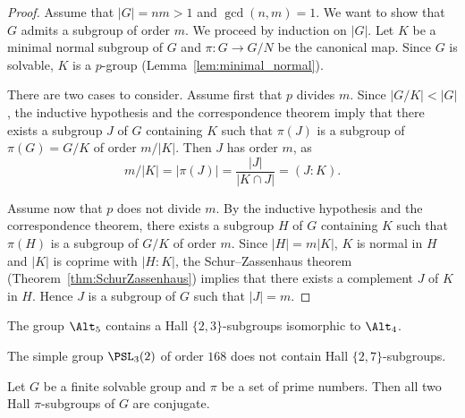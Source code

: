 \begin{proof}
	Assume that $|G|=nm>1$ and $\gcd(n,m)=1$. We want to show that $G$ admits a
	subgroup of order $m$. We proceed by induction on $|G|$. Let $K$ be a minimal
	normal subgroup of $G$ and $\pi\colon G\to G/N$ be the canonical map. Since $G$
	is solvable, $K$ is a $p$-group (Lemma~\ref{lem:minimal_normal}).
	
	There are two cases to consider. Assume first that $p$ divides $m$. Since
	$|G/K|<|G|$, the inductive hypothesis and the correspondence theorem imply that
	there exists a subgroup $J$ of $G$ containing $K$ such that $\pi(J)$ is a
	subgroup of 
    $\pi(G)=G/K$ of order $m/|K|$. Then $J$ has order $m$, as 
    \[
	m/|K|=|\pi(J)|=\frac{|J|}{|K\cap J|}=(J:K).
	\]

	Assume now that $p$ does not divide $m$. By the inductive hypothesis and the
	correspondence theorem, there exists a subgroup $H$ of $G$ containing $K$ such
	that $\pi(H)$ is a subgroup of $G/K$ of order $m$. Since $|H|=m|K|$, $K$ is
	normal in $H$ and $|K|$ is coprime with $|H:K|$, the Schur--Zassenhaus theorem
	(Theorem~\ref{thm:SchurZassenhaus}) implies that there exists a complement $J$
	of $K$ in $H$. Hence $J$ is a subgroup of $G$ such that $|J|=m$.
\end{proof}

\begin{example}
	The group $\Alt_5$ contains a Hall $\{2,3\}$-subgroups isomorphic to 
 	$\Alt_4$.
\end{example}

\begin{example}
	The simple group $\PSL_3(2)$ of order $168$ does not contain Hall $\{2,7\}$-subgroups.
\end{example}

\begin{theorem}
	\label{theorem:HallC}
	Let $G$ be a finite solvable group and $\pi$ be a set of prime numbers. 
    Then all two Hall $\pi$-subgroups of $G$ are conjugate. 
\end{theorem}

